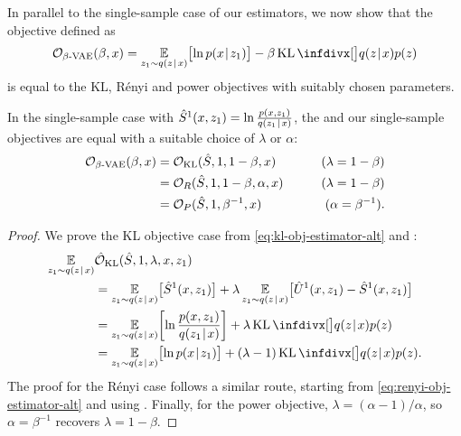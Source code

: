 In parallel to the single-sample case of our estimators, we now show that the \betavae{} \citep{higgins2016beta} objective defined as
{\def\groundprop{1.5}
\begin{align}
\label{eq:beta-vae-obj}
\mathcal{O}_{\beta\text{-VAE}}(\beta, x)
= \E_{z_1 \sim q(z\tmid x)} \bigl[ \ln p(x\tmid z_1) \bigr] - \beta \KL\Div[\big]{q(z\tmid x)}{p(z)}
\end{align}}%
is equal to the KL, Rényi and power objectives with suitably chosen parameters.

\begin{proposition}
In the single-sample case with $\hat{S}^1(x, z_1) = \ln \frac{p(x,z_1)}{q(z_1\hspace{0.08em}|\hspace{0.11em} x)}$, the \betavae{} and our single-sample objectives are equal with a suitable choice of $\lambda$ or $\alpha$:
{\setlength{\jot}{0.5\groundskip}
\begin{align*}
\mathcal{O}_{\beta\text{-VAE}}(\beta, x)
&= \mathcal{O}_{\operatorname{KL}}(\hat{S}, 1, 1-\beta, x)
 & \qquad \text{($\lambda=1-\beta$)}\\
&= \mathcal{O}_R(\hat{S}, 1, 1-\beta, \alpha, x)
 & \qquad \text{($\lambda=1-\beta$)}\\
&= \mathcal{O}_P(\hat{S}, 1, \beta^{-1}, x)
 & \qquad \text{($\alpha=\beta^{-1}$)}.
\end{align*}}%
\end{proposition}
\begin{proof}
We prove the KL objective case from \eqref{eq:kl-obj-estimator-alt} and :
\begin{align*}
\E_{z_1 \sim q(z\tmid x)} & \mathcal{\hat{O}}_{\KL}(\hat{S}, 1, \lambda, x, z_1)\\
&= \E_{z_1 \sim q(z\tmid x)} \bigl[ \hat{S}^1(x,z_1) \bigr] +
   \lambda \E_{z_1 \sim q(z\tmid x)} \bigl[ \hat{U}^1(x,z_1) - \hat{S}^1(x,z_1) \bigr]\\
&= \E_{z_1 \sim q(z\tmid x)} \biggl[ \ln \frac{p(x,z_1)}{q(z_1\tmid x)} \biggr]
    + \lambda \KL\Div[\big]{q(z\tmid x)}{p(z)}\\
&= \E_{z_1 \sim q(z\tmid x)} \bigl[ \ln p(x\tmid z_1) \bigr]
   + (\lambda - 1) \KL\Div[\big]{q(z\tmid x)}{p(z)}.
\end{align*}
The proof for the Rényi case follows a similar route, starting from \eqref{eq:renyi-obj-estimator-alt} and using .
Finally, for the power objective, $\lambda = (\alpha-1)/\alpha$, so $\alpha=\beta^{-1}$ recovers $\lambda = 1-\beta$.
\end{proof}

